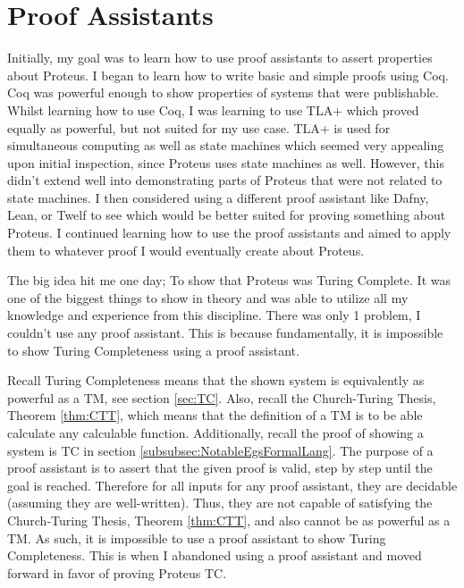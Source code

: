 \chapter{Proof Assistants}\label{app:ProofAssist}

Initially, my goal was to learn how to use proof assistants to assert properties about Proteus.
I began to learn how to write basic and simple proofs using Coq.
Coq was powerful enough to show properties of systems that were publishable.
Whilst learning how to use Coq, I was learning to use TLA+ which proved equally as powerful, but not suited for my use case.
TLA+ is used for simultaneous computing as well as state machines which seemed very appealing upon initial inspection, since Proteus uses state machines as well.
However, this didn't extend well into demonstrating parts of Proteus that were not related to state machines.
I then considered using a different proof assistant like Dafny, Lean, or Twelf to see which would be better suited for proving something about Proteus.
I continued learning how to use the proof assistants and aimed to apply them to whatever proof I would eventually create about Proteus.

The big idea hit me one day; To show that Proteus was Turing Complete.
It was one of the biggest things to show in theory and was able to utilize all my knowledge and experience from this discipline.
There was only 1 problem, I couldn't use any proof assistant.
This is because fundamentally, it is impossible to show Turing Completeness using a proof assistant.

Recall Turing Completeness means that the shown system is equivalently as powerful as a TM, see section \ref{sec:TC}.
Also, recall the Church-Turing Thesis, Theorem \ref{thm:CTT}, which means that the definition of a TM is to be able calculate any calculable function.
Additionally, recall the proof of showing a system is TC in section \ref{subsubsec:NotableEgsFormalLang}.
The purpose of a proof assistant is to assert that the given proof is valid, step by step until the goal is reached.
Therefore for all inputs for any proof assistant, they are decidable (assuming they are well-written).
Thus, they are not capable of satisfying the Church-Turing Thesis, Theorem \ref{thm:CTT}, and also cannot be as powerful as a TM.
As such, it is impossible to use a proof assistant to show Turing Completeness.
This is when I abandoned using a proof assistant and moved forward in favor of proving Proteus TC.